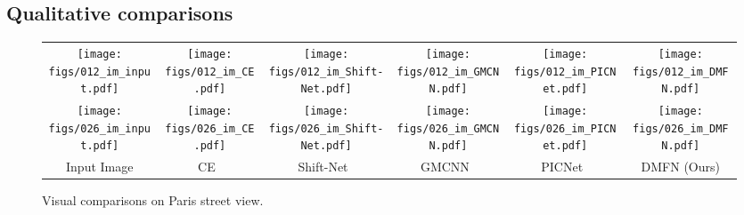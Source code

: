 \documentclass[journal]{IEEEtran}
\begin{document}
\subsection{Qualitative comparisons}
\begin{figure*}[ht]
	\centering
	\begin{adjustbox}{valign=t}
		\begin{tabular}{cccccc}
\texttt{[image: figs/012\_im\_input.pdf]} &
			\hspace{-3mm}
			\texttt{[image: figs/012\_im\_CE.pdf]} &
			\hspace{-3mm}
			\texttt{[image: figs/012\_im\_Shift-Net.pdf]} &
			\hspace{-3mm}
			\texttt{[image: figs/012\_im\_GMCNN.pdf]} &
			\hspace{-3mm}
			\texttt{[image: figs/012\_im\_PICNet.pdf]} &
			\hspace{-3mm}
			\texttt{[image: figs/012\_im\_DMFN.pdf]} \\
			
\texttt{[image: figs/026\_im\_input.pdf]} &
			\hspace{-3mm}
			\texttt{[image: figs/026\_im\_CE.pdf]} &
			\hspace{-3mm}
			\texttt{[image: figs/026\_im\_Shift-Net.pdf]} &
			\hspace{-3mm}
			\texttt{[image: figs/026\_im\_GMCNN.pdf]} &
			\hspace{-3mm}
			\texttt{[image: figs/026\_im\_PICNet.pdf]} &
			\hspace{-3mm}
			\texttt{[image: figs/026\_im\_DMFN.pdf]} \\
			
			Input Image & \hspace{-3mm} CE~\cite{CE} & \hspace{-3mm} Shift-Net~\cite{Shift-Net} & \hspace{-3mm} GMCNN~\cite{GMCNN} & PICNet~\cite{PICNet} & \hspace{-3mm} DMFN (Ours) \\
		\end{tabular}
	\end{adjustbox}
	\caption{Visual comparisons on Paris street view.}
	\label{fig:paris-streetview}
\end{figure*}
\end{document}
